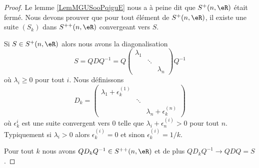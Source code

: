 \begin{proof}
    Le lemme \ref{LemMGUSooPqjguE} nous a à peine dit que \( S^+(n,\eR)\) était fermé. Nous devons prouver que pour tout élément de \( S^+(n,\eR)\), il existe une suite \( (S_k)\) dans \( S^{++}(n,\eR)\) convergeant vers \( S\).

    Si \( S\in S^+(n,\eR)\) alors nous avons la diagonalisation
    \begin{equation}
        S=QDQ^{-1} =Q
        \begin{pmatrix}
            \lambda_1    &       &       \\
                &   \ddots    &       \\
                &       &   \lambda_n
        \end{pmatrix}
        Q^{-1}
    \end{equation}
    où \( \lambda_i\geq 0\) pour tout \( i\). Nous définissons
    \begin{equation}
        D_k=
        \begin{pmatrix}
            \lambda_1+\epsilon^{(1)}_k    &       &       \\
                &   \ddots    &       \\
                &       &   \lambda_n+\epsilon^{(n)}_k
        \end{pmatrix}
    \end{equation}
    où \( \epsilon^{i}_k\) est une suite convergent vers \( 0\) telle que \( \lambda_i+\epsilon^{(i)}_n>0\) pour tout \( n\). Typiquement si \( \lambda_i>0\) alors \( \epsilon^{(i)}_k=0\) et sinon \( \epsilon^{(i)}_k=1/k\).

    Pour tout \( k\) nous avons \( QD_kQ^{-1}\in S^{++}(n,\eR)\) et de plus \( QD_kQ^{-1}\to QDQ=S\).
\end{proof}

